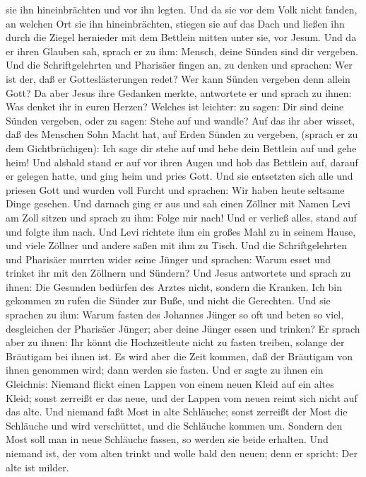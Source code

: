 sie ihn hineinbrächten und vor ihn legten.  Und da sie vor
dem Volk nicht fanden, an welchen Ort sie ihn hineinbrächten, stiegen
sie auf das Dach und ließen ihn durch die Ziegel hernieder mit dem
Bettlein mitten unter sie, vor Jesum.  Und da er ihren
Glauben sah, sprach er zu ihm: Mensch, deine Sünden sind dir vergeben.
 Und die Schriftgelehrten und Pharisäer fingen an, zu
denken und sprachen: Wer ist der, daß er Gotteslästerungen redet? Wer
kann Sünden vergeben denn allein Gott?  Da aber Jesus ihre
Gedanken merkte, antwortete er und sprach zu ihnen: Was denket ihr in
euren Herzen?  Welches ist leichter: zu sagen: Dir sind
deine Sünden vergeben, oder zu sagen: Stehe auf und wandle?
 Auf das ihr aber wisset, daß des Menschen Sohn Macht hat,
auf Erden Sünden zu vergeben, (sprach er zu dem Gichtbrüchigen): Ich
sage dir stehe auf und hebe dein Bettlein auf und gehe heim!
 Und alsbald stand er auf vor ihren Augen und hob das
Bettlein auf, darauf er gelegen hatte, und ging heim und pries Gott.
 Und sie entsetzten sich alle und priesen Gott und wurden
voll Furcht und sprachen: Wir haben heute seltsame Dinge gesehen.
 Und darnach ging er aus und sah einen Zöllner mit Namen
Levi am Zoll sitzen und sprach zu ihm: Folge mir nach!  Und
er verließ alles, stand auf und folgte ihm nach.  Und Levi
richtete ihm ein großes Mahl zu in seinem Hause, und viele Zöllner und
andere saßen mit ihm zu Tisch.  Und die Schriftgelehrten
und Pharisäer murrten wider seine Jünger und sprachen: Warum esset und
trinket ihr mit den Zöllnern und Sündern?  Und Jesus
antwortete und sprach zu ihnen: Die Gesunden bedürfen des Arztes nicht,
sondern die Kranken.  Ich bin gekommen zu rufen die Sünder
zur Buße, und nicht die Gerechten.  Und sie sprachen zu
ihm: Warum fasten des Johannes Jünger so oft und beten so viel,
desgleichen der Pharisäer Jünger; aber deine Jünger essen und trinken?
 Er sprach aber zu ihnen: Ihr könnt die Hochzeitleute nicht
zu fasten treiben, solange der Bräutigam bei ihnen ist.  Es
wird aber die Zeit kommen, daß der Bräutigam von ihnen genommen wird;
dann werden sie fasten.  Und er sagte zu ihnen ein
Gleichnis: Niemand flickt einen Lappen von einem neuen Kleid auf ein
altes Kleid; sonst zerreißt er das neue, und der Lappen vom neuen reimt
sich nicht auf das alte.  Und niemand faßt Most in alte
Schläuche; sonst zerreißt der Most die Schläuche und wird verschüttet,
und die Schläuche kommen um.  Sondern den Most soll man in
neue Schläuche fassen, so werden sie beide erhalten.  Und
niemand ist, der vom alten trinkt und wolle bald den neuen; denn er
spricht: Der alte ist milder.

